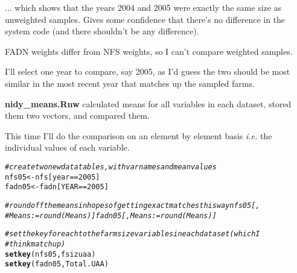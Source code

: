 \documentclass{article}\usepackage[]{graphicx}\usepackage[]{color}
\makeatletter
\newcommand{\hlcom}[1]{\textcolor[rgb]{0.678,0.584,0.686}{\textit{#1}}}%
\newcommand{\hlkwd}[1]{\textcolor[rgb]{0.737,0.353,0.396}{\textbf{#1}}}%
\newenvironment{kframe}{%
 \def\at@end@of@kframe{}%
 \ifinner\ifhmode%
  \def\at@end@of@kframe{\end{minipage}}%
  \begin{minipage}{\columnwidth}%
 \fi\fi%
 \def\FrameCommand##1{\hskip\@totalleftmargin \hskip-\fboxsep
 \colorbox{shadecolor}{##1}\hskip-\fboxsep
     \hskip-\linewidth \hskip-\@totalleftmargin \hskip\columnwidth}%
 \MakeFramed {\advance\hsize-\width
   \@totalleftmargin\z@ \linewidth\hsize
   \@setminipage}}%
 {\par\unskip\endMakeFramed%
 \at@end@of@kframe}
\newenvironment{knitrout}{}{} %
\makeatother
\begin{document}
\begin{flushleft}
\begin{kframe}


{\ttfamily\noindent\bfseries\color{errorcolor}{\#\# Error: object 'fadn.farms' not found}}\end{kframe}


... which shows that the years 2004 and 2005 were exactly the same size as unweighted samples. Gives some confidence that there's no difference in the system code (and there shouldn't be any difference). 

FADN weights differ from NFS weights, so I can't compare weighted samples. 

I'll select one year to compare, say 2005,  as I'd guess the two should be most similar in the most recent year that matches up the sampled farms. 

\textbf{nidy_means.Rnw} calculated means for all variables in each dataset, stored them two vectors, and compared them.

This time I'll do the comparison on an element by element basis \emph{i.e.} the individual values of each variable.

\begin{knitrout}
\color{fgcolor}\begin{kframe}
\begin{alltt}
\hlcom{# create two new data tables, with varnames and mean values}
nfs05 <- nfs[year == 2005]
fadn05 <- fadn[YEAR == 2005]
\end{alltt}


{\ttfamily\noindent\bfseries\color{errorcolor}{\#\# Error: object 'fadn' not found}}\begin{alltt}

\hlcom{# round off the means in hopes of getting exact matches this way nfs05[,}
\hlcom{# Means:=round(Means)] fadn05[, Means:=round(Means)]}

\hlcom{# set the key for each to the farm size variables in each dataset (which I}
\hlcom{# think match up)}
\hlkwd{setkey}(nfs05, fsizuaa)
\hlkwd{setkey}(fadn05, Total.UAA)
\end{alltt}


{\ttfamily\noindent\bfseries\color{errorcolor}{\#\# Error: object 'fadn05' not found}}\begin{alltt}

\end{alltt}
\end{kframe}
\end{knitrout}



\end{flushleft}
\end{document}
